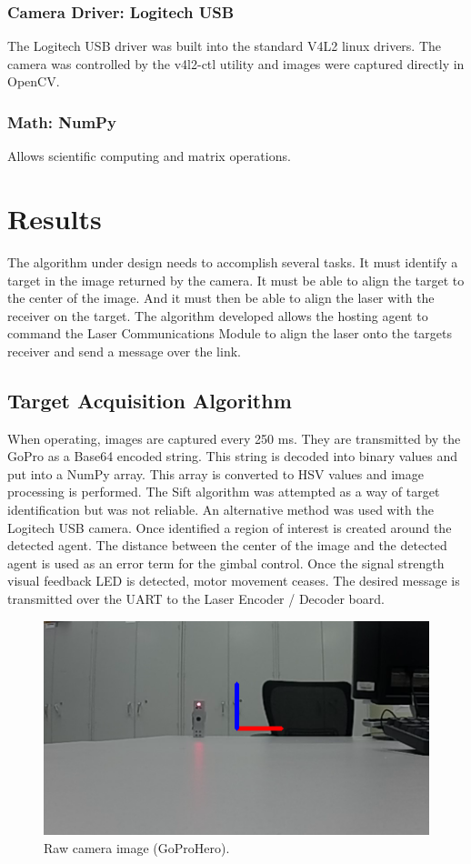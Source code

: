 \documentclass[botnum, fleqn]{unmeethesis}
\begin{document}
\subsubsection*{Camera Driver: Logitech USB}
The Logitech USB driver was built into the standard V4L2 linux drivers. The camera was controlled by the v4l2-ctl utility and images were captured directly in OpenCV.
\subsubsection*{Math: NumPy}
Allows scientific computing and matrix operations.

\section*{Results}

The algorithm under design needs to accomplish several tasks. It must identify a target in the image returned by the camera. It must be able to align the target to the center of the image. And it must then be able to align the laser with the receiver on the target. The algorithm developed allows the hosting agent to command the Laser Communications Module to align the laser onto the targets receiver and send a message over the link.

\subsection*{Target Acquisition Algorithm}

When operating, images are captured every 250 ms. They are transmitted by the GoPro as a Base64 encoded string. This string is decoded into binary values and put into a NumPy array. This array is converted to HSV values and image processing is performed. The Sift algorithm was attempted as a way of target identification but was not reliable. An alternative method was used with the Logitech USB camera. Once identified a region of interest is created around the detected agent. The distance between the center of the image and the detected agent is used as an error term for the gimbal control. Once the signal strength visual feedback LED is detected, motor movement ceases. The desired message is transmitted over the UART to the Laser Encoder / Decoder board. 

\begin{figure}[ht]
 \begin{center}
  \includegraphics[width=0.5 \textwidth]{figures/frame.png}
  \caption{\small \label{fig:frame} Raw camera image (GoProHero).}
 \end{center}
\end{figure}
\end{document}

